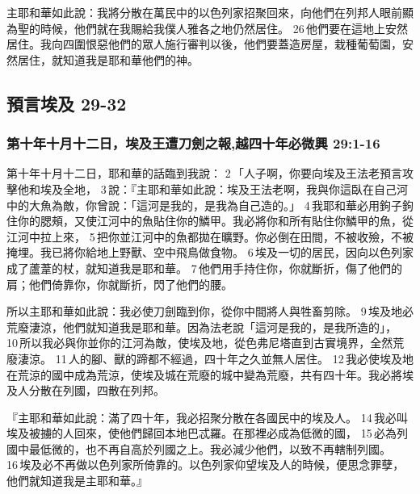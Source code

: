 主耶和華如此說：我將分散在萬民中的以色列家招聚回來，向他們在列邦人眼前顯為聖的時候，他們就在我賜給我僕人雅各之地仍然居住。 26 他們要在這地上安然居住。我向四圍恨惡他們的眾人施行審判以後，他們要蓋造房屋，栽種葡萄園，安然居住，就知道我是耶和華他們的神。

\subsection{預言埃及 29-32}
\subsubsection{第十年十月十二日，埃及王遭刀劍之報,越四十年必微興 29:1-16}
第十年十月十二日，耶和華的話臨到我說： 2 「人子啊，你要向埃及王法老預言攻擊他和埃及全地， 3 說：『主耶和華如此說：埃及王法老啊，我與你這臥在自己河中的大魚為敵，你曾說：「這河是我的，是我為自己造的。」 4 我耶和華必用鉤子鉤住你的腮頰，又使江河中的魚貼住你的鱗甲。我必將你和所有貼住你鱗甲的魚，從江河中拉上來， 5 把你並江河中的魚都拋在曠野。你必倒在田間，不被收殮，不被掩埋。我已將你給地上野獸、空中飛鳥做食物。 6 埃及一切的居民，因向以色列家成了蘆葦的杖，就知道我是耶和華。 7 他們用手持住你，你就斷折，傷了他們的肩；他們倚靠你，你就斷折，閃了他們的腰。

所以主耶和華如此說：我必使刀劍臨到你，從你中間將人與牲畜剪除。 9 埃及地必荒廢淒涼，他們就知道我是耶和華。因為法老說「這河是我的，是我所造的」， 10 所以我必與你並你的江河為敵，使埃及地，從色弗尼塔直到古實境界，全然荒廢淒涼。 11 人的腳、獸的蹄都不經過，四十年之久並無人居住。 12 我必使埃及地在荒涼的國中成為荒涼，使埃及城在荒廢的城中變為荒廢，共有四十年。我必將埃及人分散在列國，四散在列邦。


『主耶和華如此說：滿了四十年，我必招聚分散在各國民中的埃及人。 14 我必叫埃及被擄的人回來，使他們歸回本地巴忒羅。在那裡必成為低微的國， 15 必為列國中最低微的，也不再自高於列國之上。我必減少他們，以致不再轄制列國。 16 埃及必不再做以色列家所倚靠的。以色列家仰望埃及人的時候，便思念罪孽，他們就知道我是主耶和華。』

